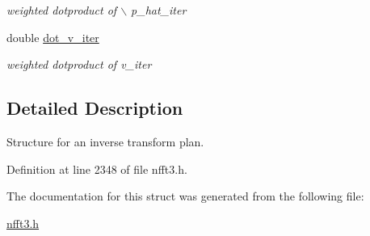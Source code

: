 \begin{CompactItemize}
\begin{CompactList}\small\item\em weighted dotproduct of $\backslash$ p\_\-hat\_\-iter \item\end{CompactList}\item 
\hypertarget{structimri__inh__3d__plan_o17}{
double \hyperlink{structimri__inh__3d__plan_o17}{dot\_\-v\_\-iter}}
\label{structimri__inh__3d__plan_o17}

\begin{CompactList}\small\item\em weighted dotproduct of v\_\-iter \item\end{CompactList}\end{CompactItemize}


\subsection{Detailed Description}
Structure for an inverse transform plan. 



Definition at line 2348 of file nfft3.h.

The documentation for this struct was generated from the following file:\begin{CompactItemize}
\item 
\hyperlink{nfft3_8h}{nfft3.h}\end{CompactItemize}
